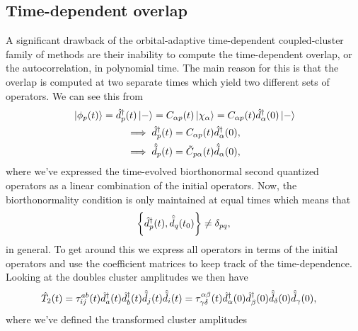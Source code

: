         \subsection{Time-dependent overlap}
            \label{subsec:autocorrelation-oatdccd}
            A significant drawback of the orbital-adaptive time-dependent
            coupled-cluster family of methods are their inability to compute the
            time-dependent overlap, or the autocorrelation, in polynomial time.
            The main reason for this is that the overlap is computed at two
            separate times which yield two different sets of operators.
            We can see this from
            \begin{gather}
                \ket*{\phi_p(t)}
                = \hat{d}^{\dagger}_{p}(t)\ket*{-}
                = C_{\alpha p}(t) \ket*{\chi_{\alpha}}
                = C_{\alpha p}(t) \hat{d}^{\dagger}_{\alpha}(0)\ket*{-}
                \\
                \implies
                \hat{d}^{\dagger}_{p}(t) = C_{\alpha p}(t) \hat{d}^{\dagger}_{\alpha}(0),
                \\
                \implies
                \hat{\tilde{d}}_{p}(t) = \tilde{C}_{p \alpha}(t) \hat{\tilde{d}}_{\alpha}(0),
            \end{gather}
            where we've expressed the time-evolved biorthonormal second
            quantized operators as a linear combination of the initial
            operators.
            Now, the biorthonormality condition is only maintained at equal
            times which means that
            \begin{align}
                \left\{\hat{d}^{\dagger}_{p}(t), \hat{\tilde{d}}_{q}(t_0)\right\} \neq \delta_{pq},
            \end{align}
            in general.
            To get around this we express all operators in terms of the initial
            operators and use the coefficient matrices to keep track of the
            time-dependence.
            Looking at the doubles cluster amplitudes we then have
            \begin{align}
                \hat{T}_2(t)
                &= \tau^{ab}_{ij}(t)
                \hat{d}^{\dagger}_{a}(t)\hat{d}^{\dagger}_{b}(t)\hat{\tilde{d}}_{j}(t)\hat{\tilde{d}}_{i}(t)
                = \tau^{\alpha \beta}_{\gamma \delta}(t)
                \hat{d}^{\dagger}_{\alpha}(0)\hat{d}^{\dagger}_{\beta}(0)
                \hat{\tilde{d}}_{\delta}(0)\hat{\tilde{d}}_{\gamma}(0),
                \label{eq:transformed-cluster-operator}
            \end{align}
            where we've defined the transformed cluster amplitudes
